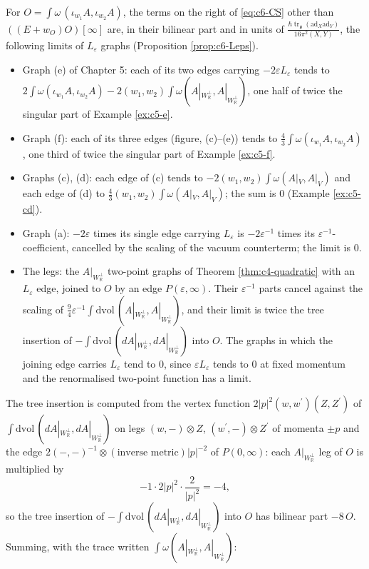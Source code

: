 \begin{example}
\label{ex:c6-bilinear}
For $O=\int\omega\,(\iota_{w_1}A,\iota_{w_2}A)$, the terms on the right of \eqref{eq:c6-CS} other than $((E+w_O)O)[\infty]$ are, in their bilinear part and in units of $\frac{\hbar\operatorname{tr}_{\mathfrak g}(\mathrm{ad}_X\mathrm{ad}_Y)}{16\pi^2(X,Y)}$, the following limits of $L_\varepsilon$ graphs (Proposition \ref{prop:c6-Leps}).
\begin{itemize}
\item Graph (e) of Chapter 5: each of its two edges carrying $-2\varepsilon L_\varepsilon$ tends to $2\int\omega(\iota_{w_1}A,\iota_{w_2}A)-2(w_1,w_2)\int\omega(A|_{W_{\mathbb R}^\perp},A|_{W_{\mathbb R}^\perp})$, one half of twice the singular part of Example \ref{ex:c5-e}.
\item Graph (f): each of its three edges (figure, (c)--(e)) tends to $\tfrac43\int\omega(\iota_{w_1}A,\iota_{w_2}A)$, one third of twice the singular part of Example \ref{ex:c5-f}.
\item Graphs (c), (d): each edge of (c) tends to $-2(w_1,w_2)\int\omega(A|_V,A|_V)$ and each edge of (d) to $\tfrac43(w_1,w_2)\int\omega(A|_V,A|_V)$; the sum is $0$ (Example \ref{ex:c5-cd}).
\item Graph (a): $-2\varepsilon$ times its single edge carrying $L_\varepsilon$ is $-2\varepsilon^{-1}$ times its $\varepsilon^{-1}$-coefficient, cancelled by the scaling of the vacuum counterterm; the limit is $0$.
\item The legs: the $A|_{W_{\mathbb R}^\perp}$ two-point graphs of Theorem \ref{thm:c4-quadratic} with an $L_\varepsilon$ edge, joined to $O$ by an edge $P(\varepsilon,\infty)$. Their $\varepsilon^{-1}$ parts cancel against the scaling of $\frac94\varepsilon^{-1}\int\mathrm{dvol}\,(A|_{W_{\mathbb R}^\perp},A|_{W_{\mathbb R}^\perp})$, and their limit is twice the tree insertion of $-\int\mathrm{dvol}\,(dA|_{W_{\mathbb R}^\perp},dA|_{W_{\mathbb R}^\perp})$ into $O$. The graphs in which the joining edge carries $L_\varepsilon$ tend to $0$, since $\varepsilon L_\varepsilon$ tends to $0$ at fixed momentum and the renormalised two-point function has a limit.
\end{itemize}
The tree insertion is computed from the vertex function $2|p|^2(w,w^{\prime})(Z,Z^{\prime})$ of $\int\mathrm{dvol}\,(dA|_{W_{\mathbb R}^\perp},dA|_{W_{\mathbb R}^\perp})$ on legs $(w,-)\otimes Z$, $(w^{\prime},-)\otimes Z^{\prime}$ of momenta $\pm p$ and the edge $2(-,-)^{-1}\otimes(\text{inverse metric})|p|^{-2}$ of $P(0,\infty)$: each $A|_{W_{\mathbb R}^\perp}$ leg of $O$ is multiplied by
\[
-1\cdot2|p|^2\cdot\frac{2}{|p|^2}=-4,
\]
so the tree insertion of $-\int\mathrm{dvol}\,(dA|_{W_{\mathbb R}^\perp},dA|_{W_{\mathbb R}^\perp})$ into $O$ has bilinear part $-8\,O$. Summing, with the trace written $\int\omega(A|_{W_{\mathbb R}^\perp},A|_{W_{\mathbb R}^\perp})$:


\end{example}
